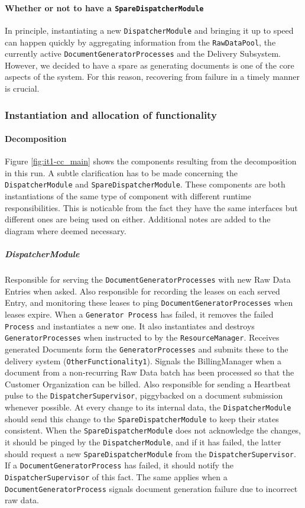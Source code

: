 \documentclass[a4paper,10pt]{article}
\begin{document}
\paragraph{Whether or not to have a \texttt{SpareDispatcherModule}}
In principle, instantiating a new \texttt{DispatcherModule} and bringing it up to speed can happen quickly by aggregating information from the \texttt{RawDataPool}, the currently active \texttt{DocumentGeneratorProcesses} and the Delivery Subsystem. However, we decided to have a spare as generating documents is one of the core aspects of the system. For this reason, recovering from failure in a timely manner is crucial.

\subsubsection{Instantiation and allocation of functionality}
\paragraph{Decomposition}
Figure \ref{fig:it1-cc_main} shows the components resulting from the decomposition in this run. A subtle clarification has to be made concerning the \texttt{DispatcherModule} and \texttt{SpareDispatcherModule}. These components are both instantiations of the same type of component with different runtime responsibilities. This is noticable from the fact they have the same interfaces but different ones are being used on either. Additional notes are added to the diagram where deemed necessary.

\subparagraph{DispatcherModule}
Responsible for serving the \texttt{DocumentGeneratorProcesses} with new Raw Data Entries when asked. Also responsible for recording the leases on each served Entry, and monitoring these leases to ping \texttt{DocumentGeneratorProcesses} when leases expire. When a \texttt{Generator Process} has failed, it removes the failed \texttt{Process} and instantiates a new one. It also instantiates and destroys \texttt{GeneratorProcesses} when instructed to by the \texttt{ResourceManager}. Receives generated Documents form the \texttt{GeneratorProcesses} and submits these to the delivery system (\texttt{OtherFunctionality1}). Signals the BillingManager when a document from a non-recurring Raw Data batch has been processed so that the Customer Organization can be billed. Also responsible for sending a Heartbeat pulse to the \texttt{DispatcherSupervisor}, piggybacked on a document submission whenever possible. At every change to its internal data, the \texttt{DispatcherModule} should send this change to the \texttt{SpareDispatcherModule} to keep their states consistent. When the \texttt{SpareDispatcherModule} does not acknowledge the changes, it should be pinged by the \texttt{DispatcherModule}, and if it has failed, the latter should request a new \texttt{SpareDispatcherModule} from the \texttt{DispatcherSupervisor}. If a \texttt{Document\-Generator\-Process} has failed, it should notify the \texttt{DispatcherSupervisor} of this fact. The same applies when a \texttt{Document\-Generator\-Process} signals document generation failure due to incorrect raw data.
\end{document}
